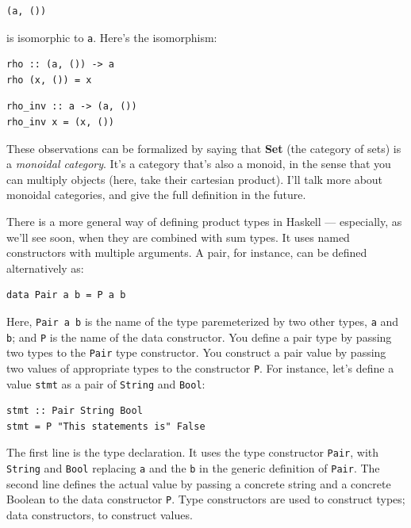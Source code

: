 \begin{verbatim}
(a, ())
\end{verbatim}

\noindent
is isomorphic to \texttt{a}. Here's the isomorphism:

\begin{verbatim}
rho :: (a, ()) -> a
rho (x, ()) = x
\end{verbatim}

\begin{verbatim}
rho_inv :: a -> (a, ())
rho_inv x = (x, ())
\end{verbatim}

\noindent
These observations can be formalized by saying that \textbf{Set} (the
category of sets) is a \emph{monoidal category}. It's a category that's
also a monoid, in the sense that you can multiply objects (here, take
their cartesian product). I'll talk more about monoidal categories, and
give the full definition in the future.

There is a more general way of defining product types in Haskell ---
especially, as we'll see soon, when they are combined with sum types. It
uses named constructors with multiple arguments. A pair, for instance,
can be defined alternatively as:

\begin{verbatim}
data Pair a b = P a b
\end{verbatim}

Here, \texttt{Pair\ a\ b} is the name of the type paremeterized by two
other types, \texttt{a} and \texttt{b}; and \texttt{P} is the name of
the data constructor. You define a pair type by passing two types to the
\texttt{Pair} type constructor. You construct a pair value by passing
two values of appropriate types to the constructor \texttt{P}. For
instance, let's define a value \texttt{stmt} as a pair of
\texttt{String} and \texttt{Bool}:

\begin{verbatim}
stmt :: Pair String Bool
stmt = P "This statements is" False
\end{verbatim}

\noindent
The first line is the type declaration. It uses the type constructor
\texttt{Pair}, with \texttt{String} and \texttt{Bool} replacing
\texttt{a} and the \texttt{b} in the generic definition of
\texttt{Pair}. The second line defines the actual value by passing a
concrete string and a concrete Boolean to the data constructor
\texttt{P}. Type constructors are used to construct types; data
constructors, to construct values.

